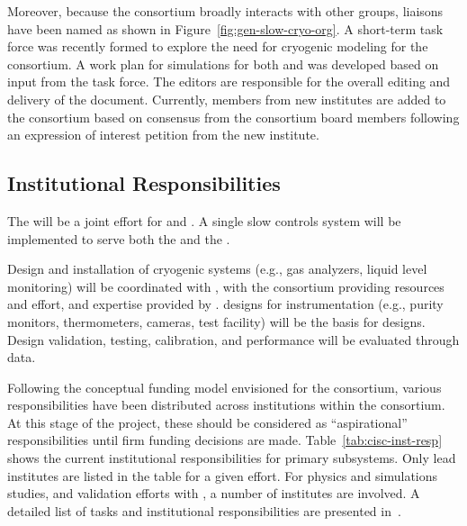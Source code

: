 Moreover, because the  consortium broadly interacts with other groups, liaisons have been named as shown in Figure~\ref{fig:gen-slow-cryo-org}. 
A short-term task force was recently formed to explore the need for cryogenic modeling for the consortium. A work plan for  simulations for both  and  was developed based on input from the task force. The  editors are responsible for the overall editing and delivery of the  document. Currently, members from new institutes are added to the consortium based on consensus from the consortium board members following an expression of interest petition from the new institute.

\subsection{Institutional Responsibilities}

The  %
will be a joint effort for \single and \dual. A single slow controls system will be implemented to serve both the  and the .

Design and installation of cryogenic systems (e.g., gas analyzers, liquid level monitoring) will be coordinated with , with the consortium providing resources and effort, and expertise provided by .  designs for \lar instrumentation (e.g., purity monitors, thermometers, cameras, test facility) will be the basis for  designs. Design validation, testing, calibration, and performance will be evaluated through  data.

Following the conceptual funding model envisioned for the consortium, various responsibilities have been distributed across institutions within the consortium. At this stage of the project, these should be considered as ``aspirational'' responsibilities until firm funding decisions are made. Table~\ref{tab:cisc-inst-resp} shows the current institutional responsibilities for primary  subsystems. Only lead institutes are listed in the table for a given effort. For physics and simulations studies, and validation efforts with , a number of institutes are involved. A detailed list of tasks and institutional responsibilities are presented in~\cite{bib:docdb5609}.

